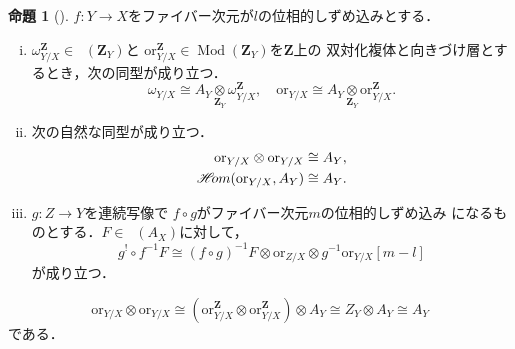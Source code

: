 \documentclass[uplatex,dvipdfmx,a4paper,10pt]{jsarticle}
\theoremstyle{definition}
\newcommand{\zz}{\mathbf{Z}}
\newcommand{\Mod}{\mathop{\mathrm{Mod}}\nolimits}
\numberwithin{equation}{section}
\newcommand{\Dompl}{\mathop{\mathsf{D}^\mathrm{+}}\nolimits}
\newcommand{\HOM}{\mathop{\mathscr{H}\hspace{-2pt}om}\nolimits}%
\newcommand{\ori}{\mathord{\mathrm{or}}}
\theoremstyle{mystyle}
\newtheorem{myprp}[mythm]{命題}
\newenvironment{prp}{\begin{prpbox}\begin{myprp}}{\end{myprp}\end{prpbox}}
\begin{document}
\begin{prp}[{\cite[命題3.3.4]{KS90}}]
    \(f\colon Y\to X\)をファイバー次元が\(l\)の位相的しずめ込みとする．
    \begin{enumerate}[(i)]
        \item \(\omega_{Y/X}^\zz\in\Dompl(\zz_Y)\)と
        \(\ori_{Y/X}^\zz\in\Mod(\zz_Y)\)を\(\zz\)上の
        双対化複体と向きづけ層とするとき，次の同型が成り立つ．\[
            \omega_{Y/X}\cong A_Y
            \mathop{\otimes}\limits_{\zz_Y}
            \omega_{Y/X}^\zz, 
            \quad
            \ori_{Y/X}\cong A_Y
            \mathop{\otimes}\limits_{\zz_Y}
            \ori_{Y/X}^\zz. 
        \]
        \item 次の自然な同型が成り立つ．
        \begin{align*}
                \ori_{Y/X}\otimes \ori_{Y/X}\cong A_Y,\\
                \HOM(\ori_{Y/X},A_Y)\cong A_Y.
        \end{align*}
        \item \(g\colon Z\to Y\)を連続写像で
        \(f\circ g\)がファイバー次元\(m\)の位相的しずめ込み
        になるものとする．\(F\in\Dompl(A_X)\)に対して，
        \[
            g^{!}\circ f^{-1}F
            \cong
            \left(f\circ g\right)^{-1}F
            \otimes \ori_{Z/X}
            \otimes g^{-1}\ori_{Y/X}[m-l]
        \]が成り立つ．
    \end{enumerate}
\end{prp}


\[
    \ori_{Y/X}\otimes \ori_{Y/X}
    \cong
    \left(\ori_{Y/X}^\zz\otimes \ori_{Y/X}^\zz\right)\otimes A_Y
    \cong Z_Y\otimes A_Y
    \cong A_Y
\]
である．
\end{document}
